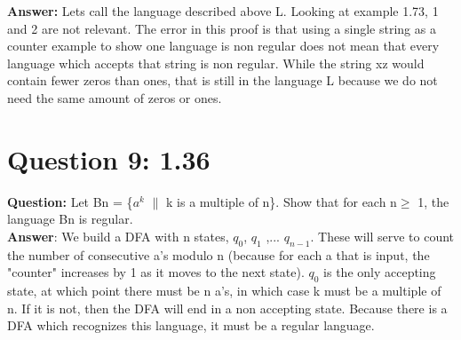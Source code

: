 \documentclass[12pt]{article}
\begin{document}
{\bfseries Answer: } Lets call the language described above L. Looking at example 1.73, 1 and 2 are not relevant. The error in this proof is that using a single string as a counter example to show one language is non regular does not mean that every language which accepts that string is non regular. While the string xz would contain fewer zeros than ones, that is still in the language L because we do not need the same amount of zeros or ones.


\section*{Question 9: 1.36}
{\bfseries Question:} Let Bn = \{$a^k$  $\|$  k is a multiple of n\}. Show that for each n$\geq$ 1, the language Bn is regular. 
\\

{\bfseries Answer}: 
We build a DFA with n states, $q_0$, $q_1$ ,... $q_{n-1}$. These will serve to count the number of consecutive a's modulo n (because for each a that is input, the "counter" increases by 1 as it moves to the next state). $q_0$ is the only accepting state, at which point there must be n a's, in which case k must be a multiple of n. If it is not, then the DFA will end in a non accepting state. Because there is a DFA which recognizes this language, it must be a regular language. 

\end{document}
